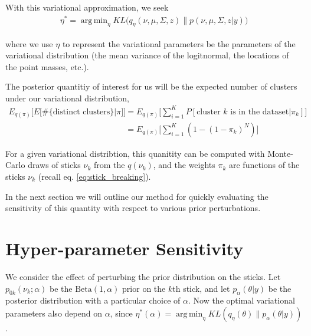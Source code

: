 \documentclass[a4paper]{article}
\DeclareMathOperator*{\argmin}{arg\,min}
\begin{document}
With this variational approximation, we seek
\begin{align}
\eta^* = \argmin_{\eta} KL\Big(q_\eta(\nu, \mu, \Sigma, z) \big\| p(\nu, \mu, \Sigma, z | y)\Big) \label{eq:kl_objective}
\end{align}

where we use $\eta$ to represent the variational parameters be the parameters of the variational distribution
(the mean variance of the logitnormal, the locations of the point masses, etc.).

The posterior quantitiy of interest for us will be the expected number of
clusters under our variational distribution,
\begin{align}
  E_{q(\pi)}\Big[E\Big[\#\{\text{distinct clusters}\}|\pi\Big]\Big] &=
  E_{q(\pi)}\Big[\sum_{i=1}^K P[\text{cluster $k$ is in the dataset}|\pi_k]\Big] \\
    &= E_{q(\pi)} \Big[\sum_{i=1}^K (1 - (1 - \pi_k)^N)\Big]
    \label{eq:expected_num_clusters}
\end{align}

For a given variational distribtion, this quanitity can be computed with
Monte-Carlo draws of sticks $\nu_k$ from the $q(\nu_k)$, and the weights $\pi_k$
are functions of the sticks $\nu_k$ (recall eq. \ref{eq:stick_breaking}).

In the next section we will outline our method for quickly evaluating the
sensitivity of this quantity with respect to various prior perturbations.

%

\section{Hyper-parameter Sensitivity}

We consider the effect of perturbing the prior distribution on the sticks.
Let $p_{0k}(\nu_k; \alpha)$ be the $\text{Beta}(1, \alpha)$ prior on the $k$th stick, and
let $p_{\alpha}(\theta | y)$ be the posterior distribution with a particular choice of $\alpha$.
Now the optimal variational parameters also depend on $\alpha$, since $\eta^*(\alpha) =
\argmin_\eta KL(q_\eta\left(\theta\right) \| p_{\alpha}(\theta | y))$.
\end{document}
